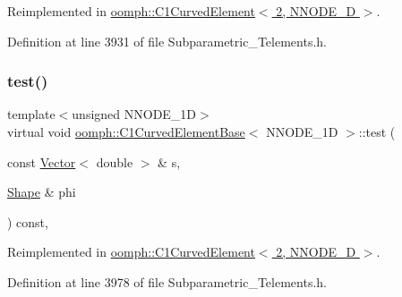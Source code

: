 Reimplemented in \hyperlink{classoomph_1_1C1CurvedElement_3_012_00_01NNODE__1D_01_4_ab90480a9e420ce7507931376fca7dbba}{oomph\+::\+C1\+Curved\+Element$<$ 2, N\+N\+O\+D\+E\+\_\+D $>$}.



Definition at line 3931 of file Subparametric\+\_\+\+Telements.\+h.

\mbox{\label{classoomph_1_1C1CurvedElementBase_aa953e1d89a6c059ac89c972feb0aea74}} 
\subsubsection{\texorpdfstring{test()}{test()}}
{\footnotesize\ttfamily template$<$unsigned N\+N\+O\+D\+E\+\_\+1D$>$ \\
virtual void \hyperlink{classoomph_1_1C1CurvedElementBase}{oomph\+::\+C1\+Curved\+Element\+Base}$<$ N\+N\+O\+D\+E\+\_\+1D $>$\+::test (\begin{DoxyParamCaption}\item[{const \hyperlink{classoomph_1_1Vector}{Vector}$<$ double $>$ \&}]{s,  }\item[{\hyperlink{classoomph_1_1Shape}{Shape} \&}]{phi }\end{DoxyParamCaption}) const\hspace{0.3cm}{\ttfamily [inline]}, {\ttfamily [virtual]}}



Reimplemented in \hyperlink{classoomph_1_1C1CurvedElement_3_012_00_01NNODE__1D_01_4_ae6c5bb18e4448678ba6f8d52fe146181}{oomph\+::\+C1\+Curved\+Element$<$ 2, N\+N\+O\+D\+E\+\_\+D $>$}.



Definition at line 3978 of file Subparametric\+\_\+\+Telements.\+h.

\mbox{\label{classoomph_1_1C1CurvedElementBase_ab259c76f5ec2f076324127a7e64cccc3}} 
